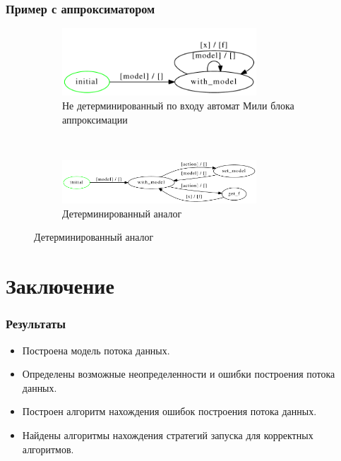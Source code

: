\documentclass[10pt,pdf,hyperref={unicode}]{beamer}
\begin{document}
\begin{frame}
  \frametitle{Пример с аппроксиматором}
    \begin{figure}[H]
  \centering

  \begin{subfigure}[b]{\textwidth}
    \centering
    \includegraphics[width=0.8\textwidth]{approx_fa.pdf}
    \caption{Не детерминированный по входу автомат Мили блока аппроксимации}
    \label{notdetFA}
  \end{subfigure}
  ~
  \begin{subfigure}[b]{\textwidth}
    \centering
    \includegraphics[width=0.8\textwidth]{approx_fa_det.pdf}
    \caption{Детерминированный аналог}
    \label{detFA}
  \end{subfigure}
  \label{det_example}
  \end{figure} 
\end{frame}

\section{Заключение}

\begin{frame}
  \frametitle{Результаты}
  \begin{itemize}
    \item Построена модель потока данных.
    \item Определены возможные неопределенности и ошибки построения потока данных.
    \item Построен алгоритм нахождения ошибок построения потока данных.
    \item Найдены алгоритмы нахождения стратегий запуска для корректных алгоритмов.
  \end{itemize}
\end{frame}
\end{document}
